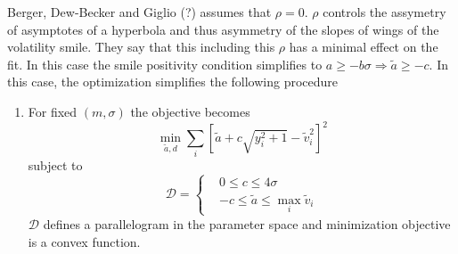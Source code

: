 \documentclass[12pt]{article}
\begin{document}
Berger, Dew-Becker and Giglio (?) assumes that $\rho = 0$. $\rho$ controls the assymetry of asymptotes of a hyperbola and thus asymmetry of the slopes of wings of the volatility smile. They say that this including this $\rho$ has a minimal effect on the fit. In this case the smile positivity condition simplifies to $a \ge -b\sigma \Rightarrow \tilde{a} \ge -c$. In this case, the optimization simplifies the following procedure
\begin{enumerate}
	\item For fixed $(m, \sigma)$ the objective becomes
	\[\min_{\tilde{a},d} \sum_{i} \left[\tilde{a} + c\sqrt{y_i^2 + 1} - \tilde{v}_i^2\right]^2\]
	subject to
	\[\mathcal{D} = \left\{
	\begin{aligned}
		& 0 \le c \le 4\sigma \\
		& -c \le \tilde{a} \le \max_i \tilde{v}_i
	\end{aligned}\right.\]
	$\mathcal{D}$ defines a parallelogram in the parameter space and minimization objective is a convex function.


\end{enumerate}
\end{document}
